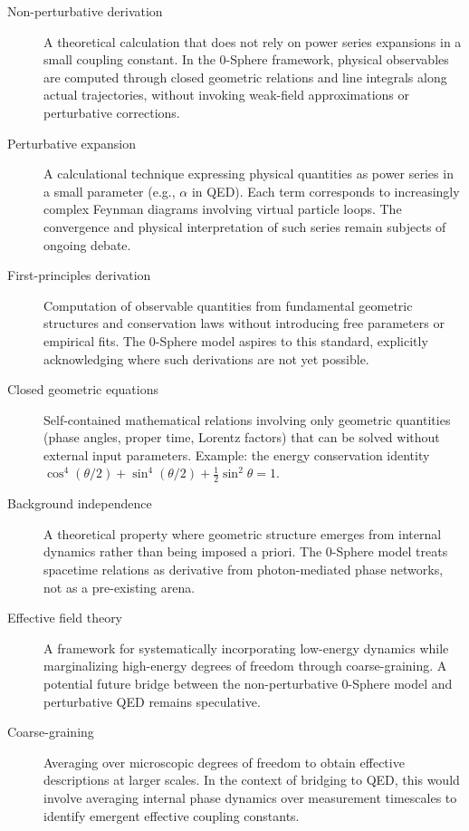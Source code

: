 \documentclass[12pt,letterpaper]{article}
\begin{document}
\begin{description}
\item[Non-perturbative derivation] A theoretical calculation that does not rely on power series expansions in a small coupling constant. In the 0-Sphere framework, physical observables are computed through closed geometric relations and line integrals along actual trajectories, without invoking weak-field approximations or perturbative corrections.

\item[Perturbative expansion] A calculational technique expressing physical quantities as power series in a small parameter (e.g., $\alpha$ in QED). Each term corresponds to increasingly complex Feynman diagrams involving virtual particle loops. The convergence and physical interpretation of such series remain subjects of ongoing debate.

\item[First-principles derivation] Computation of observable quantities from fundamental geometric structures and conservation laws without introducing free parameters or empirical fits. The 0-Sphere model aspires to this standard, explicitly acknowledging where such derivations are not yet possible.

\item[Closed geometric equations] Self-contained mathematical relations involving only geometric quantities (phase angles, proper time, Lorentz factors) that can be solved without external input parameters. Example: the energy conservation identity $\cos^4(\theta/2) + \sin^4(\theta/2) + \frac{1}{2}\sin^2\theta = 1$.

\item[Background independence] A theoretical property where geometric structure emerges from internal dynamics rather than being imposed a priori. The 0-Sphere model treats spacetime relations as derivative from photon-mediated phase networks, not as a pre-existing arena.

\item[Effective field theory] A framework for systematically incorporating low-energy dynamics while marginalizing high-energy degrees of freedom through coarse-graining. A potential future bridge between the non-perturbative 0-Sphere model and perturbative QED remains speculative.

\item[Coarse-graining] Averaging over microscopic degrees of freedom to obtain effective descriptions at larger scales. In the context of bridging to QED, this would involve averaging internal phase dynamics over measurement timescales to identify emergent effective coupling constants.

\end{description}
\end{document}
